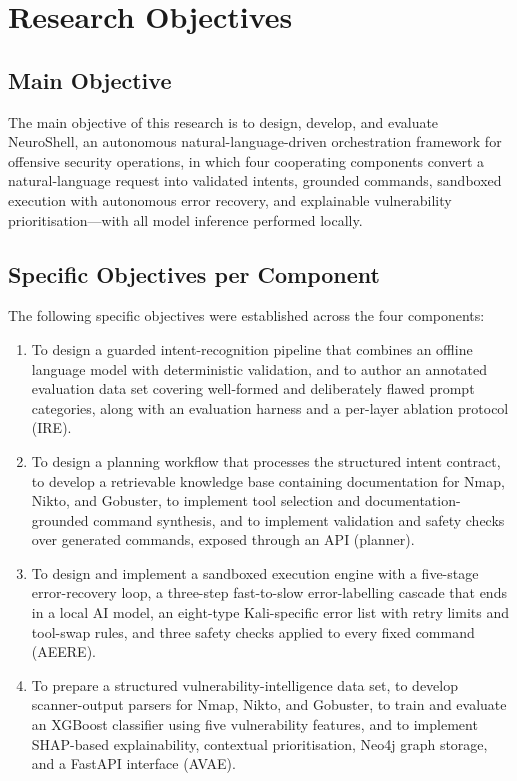 \section{Research Objectives}\label{sec:objectives}

\subsection{Main Objective}\label{sec:objectives-main}

The main objective of this research is to design, develop, and evaluate
NeuroShell, an autonomous natural-language-driven orchestration framework for
offensive security operations, in which four cooperating components convert a
natural-language request into validated intents, grounded commands, sandboxed
execution with autonomous error recovery, and explainable vulnerability
prioritisation---with all model inference performed locally.

\subsection{Specific Objectives per Component}\label{sec:objectives-specific}

The following specific objectives were established across the four components:

\begin{enumerate}
  \item To design a guarded intent-recognition pipeline that combines an offline
  language model with deterministic validation, and to author an annotated
  evaluation data set covering well-formed and deliberately flawed prompt
  categories, along with an evaluation harness and a per-layer ablation
  protocol (IRE).
  \item To design a planning workflow that processes the structured intent
  contract, to develop a retrievable knowledge base containing documentation for
  Nmap, Nikto, and Gobuster, to implement tool selection and
  documentation-grounded command synthesis, and to implement validation and
  safety checks over generated commands, exposed through an API (planner).
  \item To design and implement a sandboxed execution engine with a five-stage
  error-recovery loop, a three-step fast-to-slow error-labelling cascade that
  ends in a local AI model, an eight-type Kali-specific error list with
  retry limits and tool-swap rules, and three safety checks applied to every
  fixed command (AEERE).
  \item To prepare a structured vulnerability-intelligence data set, to develop
  scanner-output parsers for Nmap, Nikto, and Gobuster, to train and evaluate an
  XGBoost classifier using five vulnerability features, and to implement
  SHAP-based explainability, contextual prioritisation, Neo4j graph storage, and
  a FastAPI interface (AVAE).
\end{enumerate}

